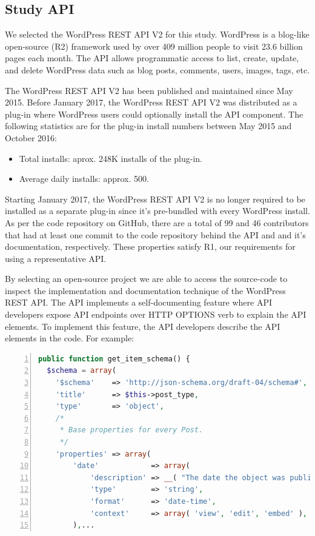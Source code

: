 \documentclass[conference]{IEEEtran}
\begin{document}
\subsection{Study API} %

We selected the WordPress REST API V2 for this study. WordPress is a blog-like open-source (R2) framework used by over 409 million people to visit 23.6 billion pages each month. The API allows programmatic access to list, create, update, and delete WordPress data such as blog posts, comments, users, images, tags, etc.

The WordPress REST API V2 has been published and maintained since May 2015. Before January 2017, the WordPress REST API V2 was distributed as a plug-in where WordPress users could optionally install the API component. The following statistics are for the plug-in install numbers between May 2015 and October 2016:

\begin{itemize}
  \item Total installs: aprox. 248K installs of the plug-in.
  \item Average daily installs: approx. 500.
\end{itemize}

Starting January 2017, the WordPress REST API V2 is no longer required to be installed as a separate plug-in since it's pre-bundled with every WordPress install. As per the code repository on GitHub, there are a total of 99 and 46 contributors that had at least one commit to the code repository behind the API and and it's documentation, respectively. These properties satisfy R1, our requirements for using a representative API.

By selecting an open-source project we are able to access the source-code to inspect the implementation and documentation technique of the WordPress REST API. The API implements a self-documenting feature where API developers expose API endpoints over HTTP OPTIONS verb to explain the API elements. To implement this feature, the API developers describe the API elements in the code. For example:


\lstset{basicstyle=\footnotesize}
\begin{lstlisting}[language=php,breaklines=true,showspaces=false,showstringspaces=false,numbers=left,xleftmargin=2em,caption={Example of self-documenting API Code},label=wordpress_code]
public function get_item_schema() {
  $schema = array(
    '$schema'    => 'http://json-schema.org/draft-04/schema#',
    'title'      => $this->post_type,
    'type'       => 'object',
    /*
     * Base properties for every Post.
     */
    'properties' => array(
        'date'            => array(
            'description' => __( "The date the object was published, in the site's timezone." ),
            'type'        => 'string',
            'format'      => 'date-time',
            'context'     => array( 'view', 'edit', 'embed' ),
        ),...
\end{lstlisting}
\end{document}
